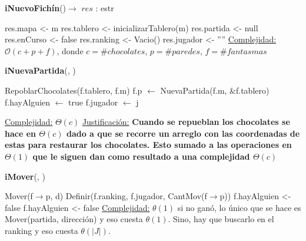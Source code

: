 \documentclass[10pt,a4paper]{article}
\begin{document}
\begin{Algoritmos}

    \begin{algorithm}[H]{\textbf{iNuevoFichín}()$\to$ $res$ : estr}
        \begin{algorithmic}
            \State res.mapa <- m
            \State res.tablero <- inicializarTablero(m) 
            \State res.partida <- null
            \State res.enCurso <- false
            \State res.ranking <- Vacio()
            \State res.jugador <- ''''
            \Statex \underline{Complejidad:} $\mathcal{O}(c + p + f)$, donde $c = \#chocolates$, $p = \#paredes$, $f = \#fantasmas$
        \end{algorithmic}
    \end{algorithm}

    \begin{algorithm}[H]{\textbf{iNuevaPartida}(, )}
        \begin{algorithmic}
        
            \State RepoblarChocolates(f.tablero, f.m)
            \State f.p $\leftarrow$ NuevaPartida(f.m, &f.tablero)
            \State f.hayAlguien $\leftarrow$ true
            \State f.jugador $\leftarrow$ j
        
            \Statex \underline{Complejidad:} $\Theta(c)$
            \Statex \underline{Justificación:} \textbf{Cuando se repueblan los chocolates se hace en $\Theta(c)$ dado a que se recorre un arreglo con las coordenadas de estas para restaurar los chocolates.
		Esto sumado a las operaciones en $\Theta(1)$ que le siguen dan como resultado a una complejidad $\Theta(c)$}
        \end{algorithmic}
    \end{algorithm}

    \begin{algorithm}[H]{\textbf{iMover}(, })
        \begin{algorithmic}
            \State Mover(f$\to$p, d)
                \State Definir(f.ranking, f.jugador, CantMov(f$\to$p))
                \State f.hayAlguien <- false
            \Else
                    \State f.hayAlguien <- false
                \EndIf
            \EndIf
            \State \underline{Complejidad:} $\theta(1)$ si no ganó, lo único que se hace es Mover(partida, dirección) y eso cuesta $\theta(1)$. Sino, hay que buscarlo en el ranking y eso cuesta $\theta(|J|)$.
        \end{algorithmic}
        

\end{algorithm}
\end{Algoritmos}
\end{document}
